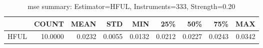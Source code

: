 \begin{table}[ht]
\centering
\caption{mse summary: Estimator=HFUL, Instruments=333, Strength=0.20}
\begin{tabular}{lrrrrrrrr}
\toprule
 & COUNT & MEAN & STD & MIN & 25\% & 50\% & 75\% & MAX \\
\midrule
HFUL & 10.0000 & 0.0232 & 0.0055 & 0.0132 & 0.0212 & 0.0227 & 0.0243 & 0.0342 \\
\bottomrule
\end{tabular}
\end{table}
